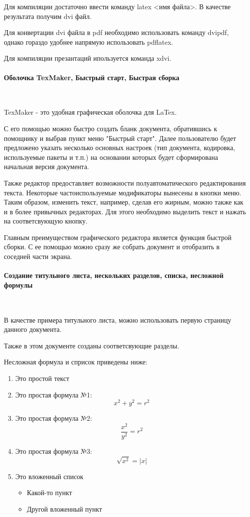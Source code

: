 \documentclass{article}
\begin{document}
Для компиляции достаточно ввести команду latex <имя файла>. В качестве результата получим dvi файл.

Для конвертации dvi файла в pdf необходимо использовать команду dvipdf, однако гораздо удобнее напрямую использовать pdflatex.

Для компиляции презантаций ипользуется команда xdvi.

\paragraph{Оболочка TexMaker, Быстрый старт, Быстрая сборка}
~

TexMaker - это удобная графическая оболочка для LaTex.

С его помощью можно быстро создать бланк документа, обратившись к помощнику и выбрав пункт меню "Быстрый старт". Далее пользователю будет предложено указать несколько основных настроек (тип документа, кодировка, используемые пакеты и т.п.) на основании которых будет сформирована начальная версия документа.

Также редактор предоставляет возможности полуавтоматического редактирования текста. Некоторые частоиспользуемые модификаторы вынесены в кнопки меню. Таким образом, изменить текст, например, сделав его жирным, можно также как и в более привычных редакторах. Для этого необходимо выделить текст и нажать на соответсвующую кнопку.

Главным преимуществом графического редактора является функция быстрой сборки. С ее помощью можно сразу же собрать документ и отобразить в соседней части экрана.

\paragraph{Создание титульного листа, нескольких разделов, списка, несложной формулы}
~

В качестве примера титульного листа, можно использовать первую страницу данного документа.

Также в этом документе созданы соответсвующие разделы.

Несложная формула и сприсок приведены ниже:
\begin{enumerate}
\item Это простой текст
\item Это простая формула №1: $$ x^2+y^2=r^2 $$
\item Это простая формула №2: $$ \frac{x^2}{y^2}=r^2 $$
\item Это простая формула №3: $$ \sqrt{x^2}=|x| $$
\item Это вложенный список
	\begin{itemize}
	\item Какой-то пункт
	\item Другой вложенный пункт
	\end{itemize}
\end{enumerate}
\end{document}
